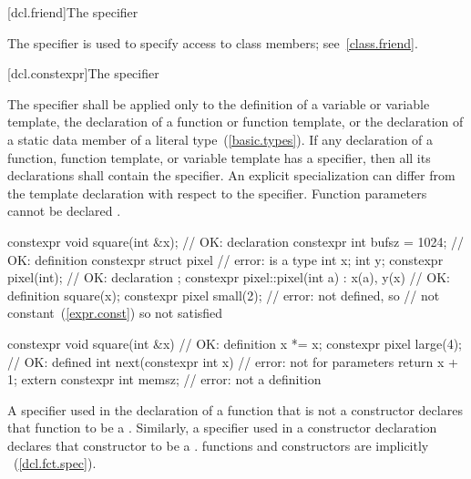 [dcl.friend]{The  specifier}%

\pnum
The  specifier is used to specify access to class members;
see~\ref{class.friend}.

[dcl.constexpr]{The  specifier}%

\pnum
The  specifier shall be applied only to the definition of
a variable or variable template,
the declaration of a
function or function template, or the declaration of a static
data member of a literal type~(\ref{basic.types}).
If any declaration of a function, function template, or variable template has
a  specifier,
then all its declarations shall contain the  specifier. \enternote An
explicit specialization can differ from the template declaration with respect to the
 specifier. \exitnote
\enternote
Function parameters cannot be declared .\exitnote
\enterexample
\begin{codeblock}
constexpr void square(int &x);  // OK: declaration
constexpr int bufsz = 1024;     // OK: definition
constexpr struct pixel {        // error:  is a type
  int x;
  int y;
  constexpr pixel(int);         // OK: declaration
}; 
constexpr pixel::pixel(int a)
  : x(a), y(x)                  // OK: definition
  { square(x); }
constexpr pixel small(2);       // error:  not defined, so 
                                // not constant~(\ref{expr.const}) so  not satisfied

constexpr void square(int &x) { // OK: definition
  x *= x;
}
constexpr pixel large(4);       // OK:  defined
int next(constexpr int x) {     // error: not for parameters
     return x + 1;
} 
extern constexpr int memsz;     // error: not a definition 
\end{codeblock}
\exitexample

\pnum
A  specifier used in the declaration of a function that is not a
constructor declares that
function to be a . Similarly, a
 specifier used in 
a constructor declaration declares that constructor to be a
.
 functions and  constructors are
implicitly ~(\ref{dcl.fct.spec}).

